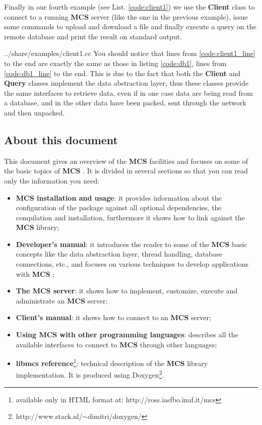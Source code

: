 \documentclass[12pt,titlepage]{article}
\newcommand{\mcs}{\textbf{MCS} }
\def\url{http://ross.iasfbo.inaf.it/mcs}
\begin{document}
\medskip
\noindent
Finally in our fourth example (see List. \ref{code:client1}) we
use the \textbf{Client} class to connect to a running \mcs server
(like the one in the previous example), issue some commands to upload
and download a file and finally execute a query on the remote database
and print the result on standard output.
%

{../share/examples/client1.cc}
%
You should notice that lines from \ref{code:client1_line} to the end are
exactly the same as those in listing \ref{code:db1}, lines from
\ref{code:db1_line} to the end. This is due to the fact that both the
\textbf{Client} and \textbf{Query} classes implement the data abstraction
layer, thus these classes provide the same interfaces to retrieve data, even
if in one case data are being read from a database, and in the other data have
been packed, sent through the network and then unpacked.

%
%
\subsection{About this document}
\label{sec:aboutthisdocument}
This document gives an overview of the \mcs facilities and focuses on
some of the basic topics of \mcs. It is divided in several sections so
that you can read only the information you need:
\begin{itemize}

\item \textbf{\mcs installation and usage}: it provides information about
  the configuration of the package against all optional dependencies,
  the compilation and installation, furthermore it shows how to link
  against the \mcs library;

\item \textbf{Developer's manual}: it introduces the reader to some of the
  \mcs basic concepts like the data abstraction layer, thread
  handling, database connections, etc., and focuses on various
  techniques to develop applications with \mcs;

\item \textbf{The \mcs server}: it shows how to implement, customize,
  execute and administrate an \mcs server;

\item \textbf{Client's manual}: it shows how to connect to an \mcs
  server;

\item \textbf{Using \mcs with other programming languages}: describes
  all the available interfaces to connect to \mcs through other
  languages;

\item \textbf{libmcs reference}\footnote{available only in HTML format
    at: \textsf{\url}}: technical description of the \mcs library
  implementation. It is produced using
  \textsf{Doxygen}\footnote{http://www.stack.nl/$\sim$dimitri/doxygen/}.
\end{itemize}
\end{document}
